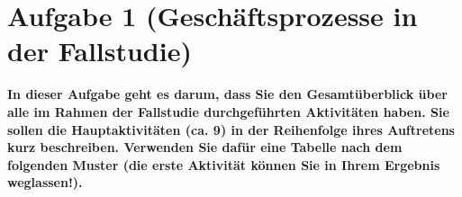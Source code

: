 \section{Aufgabe 1 (Geschäftsprozesse in der Fallstudie)}
\textbf{In dieser Aufgabe geht es darum, dass Sie den Gesamtüberblick über alle im Rahmen der
Fallstudie durchgeführten Aktivitäten haben. Sie sollen die Hauptaktivitäten (ca. 9) in der
Reihenfolge ihres Auftretens kurz beschreiben. Verwenden Sie dafür eine Tabelle nach
dem folgenden Muster (die erste Aktivität  können Sie
in Ihrem Ergebnis weglassen!).} 

\clearpage